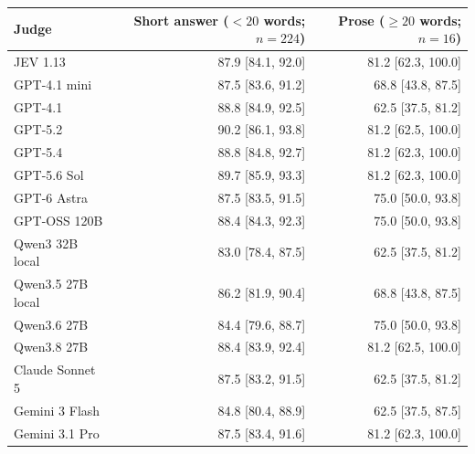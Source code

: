\begin{tabular}{@{}lrr@{}}
\toprule
Judge & Short answer ($<20$ words; $n=224$) & Prose ($\geq20$ words; $n=16$) \\
\midrule
JEV 1.13 & 87.9 [84.1, 92.0] & 81.2 [62.3, 100.0] \\
GPT-4.1 mini & 87.5 [83.6, 91.2] & 68.8 [43.8, 87.5] \\
GPT-4.1 & 88.8 [84.9, 92.5] & 62.5 [37.5, 81.2] \\
GPT-5.2 & 90.2 [86.1, 93.8] & 81.2 [62.5, 100.0] \\
GPT-5.4 & 88.8 [84.8, 92.7] & 81.2 [62.3, 100.0] \\
GPT-5.6 Sol & 89.7 [85.9, 93.3] & 81.2 [62.3, 100.0] \\
GPT-6 Astra & 87.5 [83.5, 91.5] & 75.0 [50.0, 93.8] \\
GPT-OSS 120B & 88.4 [84.3, 92.3] & 75.0 [50.0, 93.8] \\
Qwen3 32B local & 83.0 [78.4, 87.5] & 62.5 [37.5, 81.2] \\
Qwen3.5 27B local & 86.2 [81.9, 90.4] & 68.8 [43.8, 87.5] \\
Qwen3.6 27B & 84.4 [79.6, 88.7] & 75.0 [50.0, 93.8] \\
Qwen3.8 27B & 88.4 [83.9, 92.4] & 81.2 [62.5, 100.0] \\
Claude Sonnet 5 & 87.5 [83.2, 91.5] & 62.5 [37.5, 81.2] \\
Gemini 3 Flash & 84.8 [80.4, 88.9] & 62.5 [37.5, 87.5] \\
Gemini 3.1 Pro & 87.5 [83.4, 91.6] & 81.2 [62.3, 100.0] \\
\bottomrule
\end{tabular}
